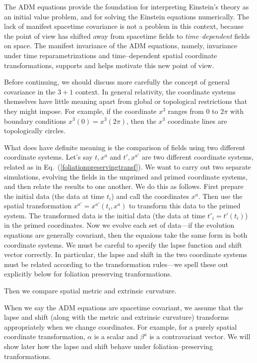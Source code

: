 \documentclass[letterpaper,nofootinbib,prd,amsmath,onecolumn]{revtex4-1}
\begin{document}
The ADM equations provide the foundation for interpreting Einstein's theory as an initial value problem, 
and for solving the Einstein equations numerically. 
The lack of manifest spacetime covariance is not a problem in this context, because the point of view has shifted away from 
spacetime fields to {\em time--dependent} fields on space. The manifest invariance of the ADM equations, namely, 
invariance under time reparametrizations and time--dependent 
spatial coordinate transformations, supports and helps motivate this new point of view. 

Before continuing, we should discuss more carefully the concept of general covariance in the $3+1$ context. 
In general relativity, the coordinate systems themselves have little meaning apart from 
global or topological restrictions that they might impose. For example, if the coordinate $x^3$ ranges from $0$ to $2\pi$ 
with boundary conditions $x^3\left(0\right) = x^3\left(2\pi\right)$, then the $x^3$ coordinate lines are topologically circles. 

What does have definite meaning is the comparison of fields using two different coordinate systems. Let's say $t,x^{a}$ and $t',x^{a'}$ are 
two different coordinate systems, related as in Eq.~(\ref{foliationpreservingtransf}). We want to carry out two separate simulations, 
evolving the fields in the unprimed and primed coordinate systems, and then relate the results to one another.  We do this as follows. 
First prepare the initial data (the data at time $t_i$) and call the coordinates $x^a$. Then use the spatial transformation 
$x^{a'} = x^{a'}\left(t_i,x^a\right)$ to transform this data to the primed system. The transformed data is the initial data (the data at time $t'_i = t'\left(t_i\right)$) 
in the primed coordinates. Now we evolve each set of data---if the evolution equations are generally covariant, then the equaions 
take the same form in both coordinate systems. We must be careful to specify the lapse function and shift vector correctly. In particular, 
the lapse and shift in the two coordinate systems must be related according to the transformation rules---we spell these out explicitly 
below for foliation preserving tranformations. 

Then we compare spatial metric and extrinsic curvature. 

When we say the ADM equations are spacetime covariant, we assume that the lapse and shift (along with the metric and extrinsic 
curvature) transforms appropriately when we change coordinates. For example, for a purely spatial coordinate transformation, $\alpha$ is a 
scalar and $\beta^a$ is a contravariant vector. We will show later how the lapse and shift behave under foliation--preserving 
tranformations. 
\end{document}
